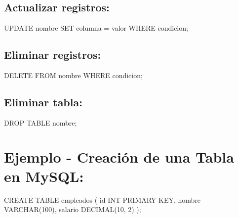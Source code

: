 \documentclass[
  a4paper,
  DIV=11,
  numbers=noendperiod,
  onepage,
  openany]{scrreprt}
\newenvironment{Shaded}{\begin{snugshade}}{\end{snugshade}}
\newcommand{\DataTypeTok}[1]{\textcolor[rgb]{0.68,0.00,0.00}{#1}}
\newcommand{\DecValTok}[1]{\textcolor[rgb]{0.68,0.00,0.00}{#1}}
\newcommand{\KeywordTok}[1]{\textcolor[rgb]{0.00,0.23,0.31}{#1}}
\newcommand{\NormalTok}[1]{\textcolor[rgb]{0.00,0.23,0.31}{#1}}
\newcommand{\OperatorTok}[1]{\textcolor[rgb]{0.37,0.37,0.37}{#1}}
\begin{document}
\hypertarget{actualizar-registros-2}{%
\subsection{Actualizar registros:}\label{actualizar-registros-2}}

\begin{Shaded}
\begin{Highlighting}[]
\KeywordTok{UPDATE}\NormalTok{ nombre }\KeywordTok{SET}\NormalTok{ columna }\OperatorTok{=}\NormalTok{ valor }\KeywordTok{WHERE}\NormalTok{ condicion;}
\end{Highlighting}
\end{Shaded}

\hypertarget{eliminar-registros-2}{%
\subsection{Eliminar registros:}\label{eliminar-registros-2}}

\begin{Shaded}
\begin{Highlighting}[]
\KeywordTok{DELETE} \KeywordTok{FROM}\NormalTok{ nombre }\KeywordTok{WHERE}\NormalTok{ condicion;}
\end{Highlighting}
\end{Shaded}

\hypertarget{eliminar-tabla}{%
\subsection{Eliminar tabla:}\label{eliminar-tabla}}

\begin{Shaded}
\begin{Highlighting}[]
\KeywordTok{DROP} \KeywordTok{TABLE}\NormalTok{ nombre;}
\end{Highlighting}
\end{Shaded}

\hypertarget{ejemplo---creaciuxf3n-de-una-tabla-en-mysql}{%
\section{Ejemplo - Creación de una Tabla en
MySQL:}\label{ejemplo---creaciuxf3n-de-una-tabla-en-mysql}}

\begin{Shaded}
\begin{Highlighting}[]
\KeywordTok{CREATE} \KeywordTok{TABLE}\NormalTok{ empleados (}
    \KeywordTok{id} \DataTypeTok{INT} \KeywordTok{PRIMARY} \KeywordTok{KEY}\NormalTok{,}
\NormalTok{    nombre }\DataTypeTok{VARCHAR}\NormalTok{(}\DecValTok{100}\NormalTok{),}
\NormalTok{    salario }\DataTypeTok{DECIMAL}\NormalTok{(}\DecValTok{10}\NormalTok{, }\DecValTok{2}\NormalTok{)}
\NormalTok{);}
\end{Highlighting}
\end{Shaded}
\end{document}
